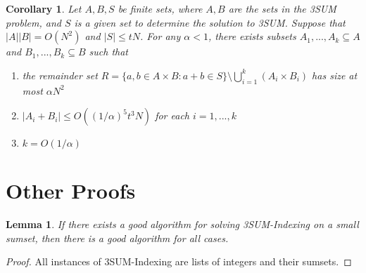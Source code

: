 \documentclass{article}
\newtheorem{lemma}{Lemma}
\newtheorem{corollary}{Corollary}
\begin{document}
\begin{corollary}
\label{BSG Corollary}
Let $A,B,S$ be finite sets, where $A,B$ are the sets in the 3SUM problem, and $S$ is a given set to determine the solution to 3SUM. Suppose that $|A||B| = O(N^2)$ and $|S| \leq tN$. For any $\alpha < 1$, there exists subsets $A_1,...,A_k \subseteq A$ and $B_1,...,B_k \subseteq B$ such that
\begin{enumerate}
    \item the remainder set $R = \{a,b \in A \times B : a+b \in S\} \setminus \bigcup^k_{i=1} (A_i \times B_i)$ has size at most $\alpha N^2$
    \item $|A_i + B_i| \leq O((1/\alpha)^5t^3N)$ for each $i=1,...,k$
    \item $k = O(1/\alpha)$
\end{enumerate}
\end{corollary}

\section{Other Proofs}
\label{sec:other}

\begin{lemma}
\label{Difficulty of 3SUM-Indexing}
If there exists a good algorithm for solving 3SUM-Indexing on a small sumset, then there is a good algorithm for all cases.
\end{lemma}

\begin{proof}
All instances of 3SUM-Indexing are lists of integers and their sumsets.
\end{proof}
\end{document}

